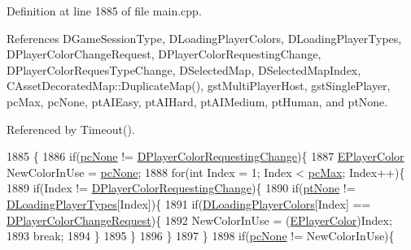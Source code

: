 Definition at line 1885 of file main.\+cpp.



References D\+Game\+Session\+Type, D\+Loading\+Player\+Colors, D\+Loading\+Player\+Types, D\+Player\+Color\+Change\+Request, D\+Player\+Color\+Requesting\+Change, D\+Player\+Color\+Reques\+Type\+Change, D\+Selected\+Map, D\+Selected\+Map\+Index, C\+Asset\+Decorated\+Map\+::\+Duplicate\+Map(), gst\+Multi\+Player\+Host, gst\+Single\+Player, pc\+Max, pc\+None, pt\+A\+I\+Easy, pt\+A\+I\+Hard, pt\+A\+I\+Medium, pt\+Human, and pt\+None.



Referenced by Timeout().


\begin{DoxyCode}
1885                                                   \{
1886     \textcolor{keywordflow}{if}(\hyperlink{GameDataTypes_8h_aafb0ca75933357ff28a6d7efbdd7602fa88767aa8e02c7b3192bbab4127b3d729}{pcNone} != \hyperlink{classCApplicationData_a5231cd0c9d8bb76ab32c7f2a114e41f1}{DPlayerColorRequestingChange})\{
1887         \hyperlink{GameDataTypes_8h_aafb0ca75933357ff28a6d7efbdd7602f}{EPlayerColor} NewColorInUse = \hyperlink{GameDataTypes_8h_aafb0ca75933357ff28a6d7efbdd7602fa88767aa8e02c7b3192bbab4127b3d729}{pcNone};
1888         \textcolor{keywordflow}{for}(\textcolor{keywordtype}{int} Index = 1; Index < \hyperlink{GameDataTypes_8h_aafb0ca75933357ff28a6d7efbdd7602fa594a5c8dd3987f24e8a0f23f1a72cd34}{pcMax}; Index++)\{
1889             \textcolor{keywordflow}{if}(Index != \hyperlink{classCApplicationData_a5231cd0c9d8bb76ab32c7f2a114e41f1}{DPlayerColorRequestingChange})\{
1890                 \textcolor{keywordflow}{if}(\hyperlink{classCApplicationData_ae04b6b340297311972ce1e955196fcaaa091de1adaa447ed15f9f6bb25f0880f7}{ptNone} != \hyperlink{classCApplicationData_a2ac5711b027842d57aa5f8e5a7adc589}{DLoadingPlayerTypes}[Index])\{
1891                     \textcolor{keywordflow}{if}(\hyperlink{classCApplicationData_ab29b80d90f1201608dcb498cd627a6f9}{DLoadingPlayerColors}[Index] == 
      \hyperlink{classCApplicationData_ae72fd0906b911705aafb9df8cf610f97}{DPlayerColorChangeRequest})\{
1892                         NewColorInUse = (\hyperlink{GameDataTypes_8h_aafb0ca75933357ff28a6d7efbdd7602f}{EPlayerColor})Index;
1893                         \textcolor{keywordflow}{break};
1894                     \}
1895                 \}
1896             \}
1897         \}
1898         \textcolor{keywordflow}{if}(\hyperlink{GameDataTypes_8h_aafb0ca75933357ff28a6d7efbdd7602fa88767aa8e02c7b3192bbab4127b3d729}{pcNone} != NewColorInUse)\{

\end{DoxyCode}
